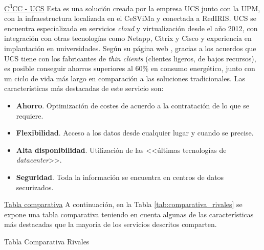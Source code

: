 \noindent\underline{C\textsuperscript{3}CC - \acs{UCS}}\newline
\indent Esta es una solución creada por la empresa \acf{UCS} junto con la \acf{UPM}, con la infraestructura localizada en el \acf{CeSViMa} y conectada a RedIRIS. \acs{UCS} se encuentra especializada en servicios \textit{cloud} y virtualización desde el año 2012, con integración con otras tecnologías como Netapp, Citrix y Cisco y experiencia en implantación en universidades. Según su página web \cite{c3ce}, gracias a los acuerdos que \acs{UCS} tiene con los fabricantes de \textit{thin clients} (clientes ligeros, de bajos recursos), es posible conseguir ahorros superiores al 60\% en consumo energético, junto con un ciclo de vida más largo en comparación a las soluciones tradicionales. Las características más destacadas de este servicio son:

\begin{itemize}
    \item \textbf{Ahorro}. Optimización de costes de acuerdo a la contratación de lo que se requiere.
    
    \item \textbf{Flexibilidad}. Acceso a los datos desde cualquier lugar y cuando se precise.
    
    \item \textbf{Alta disponibilidad}. Utilización de las <<últimas tecnologías de \textit{datacenter}>>.
    
    \item \textbf{Seguridad}. Toda la información se encuentra en centros de datos securizados.
\end{itemize}

\noindent\underline{Tabla comparativa}\newline
\indent A continuación, en la Tabla \ref{tab:comparativa_rivales} se expone una tabla comparativa teniendo en cuenta algunas de las características más destacadas que la mayoría de los servicios descritos comparten.

\begin{table}[hp]
	\centering
	{\small
		
	}
	\caption[Tabla Comparativa Rivales]
	{Tabla Comparativa Rivales}
	\label{tab:comparativa_rivales}
\end{table}

\clearpage

